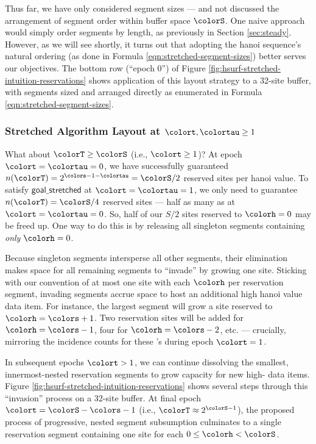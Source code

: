 Thus far, we have only considered segment sizes --- and not discussed the arrangement of segment order within buffer space $\colorS$.
One naive approach would simply order segments by length, as previously in Section \ref{sec:steady}.
However, as we will see shortly, it turns out that adopting the hanoi sequence's natural ordering (as done in Formula \ref{eqn:stretched-segment-sizes}) better serves our objectives.
The bottom row (``epoch 0'') of Figure \ref{fig:hsurf-stretched-intuition-reservations} shows application of this layout strategy to a 32-site buffer, with segments sized and arranged directly as enumerated in Formula \ref{eqn:stretched-segment-sizes}.

\subsubsection{Stretched Algorithm Layout at $\colort,\colortau\geq1$}

What about $\colorT \geq \colorS$ (i.e., $\colort \geq 1$)?
At epoch $\colort=\colortau=0$, we have successfully guaranteed $n(\colorT) = 2^{\colors - 1 - \colortau} = \colorS / 2$ reserved sites per hanoi value.
To satisfy $\textsf{goal\_stretched}$ at $\colort=\colortau=1$, we only need to guarantee $n(\colorT) = \colorS/4$ reserved sites --- half as many as at $\colort=\colortau=0$.
So, half of our $S/2$ sites reserved to \hv{} $\colorh=0$ may be freed up.
One way to do this is by releasing all singleton segments containing \textit{only} \hv{} $\colorh=0$.

Because singleton segments intersperse all other segments, their elimination makes space for all remaining segments to ``invade'' by growing one site.
Sticking with our convention of at most one site with each \hv{} $\colorh$ per reservation segment, invading segments accrue space to host an additional high hanoi value data item.
For instance, the largest segment will grow a site reserved to \hv{} $\colorh=\colors +1$.
Two reservation sites will be added for \hv{} $\colorh=\colors - 1$, four for \hv{} $\colorh=\colors - 2$, etc. --- crucially, mirroring the incidence counts for these \hv{}'s during epoch $\colort=1$.

In subsequent epochs $\colort>1$, we can continue dissolving the smallest, innermost-nested reservation segments to grow capacity for new high-\hv{} data items.
Figure \ref{fig:hsurf-stretched-intuition-reservations} shows several steps through this ``invasion'' process on a 32-site buffer.
At final epoch $\colort=\colorS-\colors - 1$ (i.e., $\colorT \approx 2^{\colorS - 1}$), the proposed process of progressive, nested segment subsumption culminates to a single reservation segment containing one site for each \hv{} $0 \leq \colorh < \colorS$.

